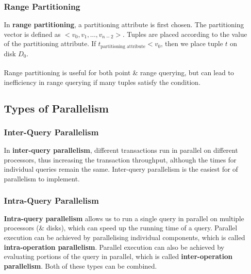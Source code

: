 \documentclass[a4paper,11pt]{article}
\begin{document}
\subsubsection{Range Partitioning}
In \textbf{range partitioning}, a partitioning attribute is first chosen. 
The partitioning vector is defined as $< v_0, v_1, \dots, v_{n-2} >$. 
Tuples are placed according to the value of the partitioning attribute.
If $t_\text{partitioning attribute} < v_0$, then we place tuple $t$ on disk $D_0$.
\\\\
Range partitioning is useful for both point \& range querying, but can lead to inefficiency in range querying 
if many tuples satisfy the condition.

\subsection{Types of Parallelism}
\subsubsection{Inter-Query Parallelism}
In \textbf{inter-query parallelism}, different transactions run in parallel on different processors, thus 
increasing the transaction throughput, although the times for individual queries remain the same.
Inter-query parallelism is the easiest for of parallelism to implement.

\subsubsection{Intra-Query Parallelism}
\textbf{Intra-query parallelism} allows us to run a single query in parallel on multiple processors (\& disks), 
which can speed up the running time of a query.
Parallel execution can be achieved by parallelising individual components, which is called
\textbf{intra-operation parallelism}. 
Parallel execution can also be achieved by evaluating portions of the query in parallel, which is called 
\textbf{inter-operation parallelism}.
Both of these types can be combined.
\end{document}
